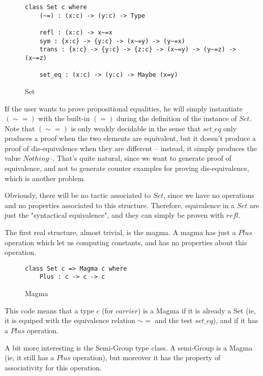 \begin{figure}[H]
\figrule
\begin{center}
\begin{verbatim}
class Set c where
    (~=) : (x:c) -> (y:c) -> Type

    refl : (x:c) -> x~=x
    sym : {x:c} -> {y:c} -> (x~=y) -> (y~=x)
    trans : {x:c} -> {y:c} -> {z:c} -> (x~=y) -> (y~=z) -> (x~=z)    
    
    set_eq : (x:c) -> (y:c) -> Maybe (x=y)
\end{verbatim}
\end{center}
\caption{Set}
\figrule
\end{figure}
If the user wants to prove propositional equalities, he will simply instantiate $(\sim=)$ with the built-in $(=)$ during the definition of the instance of $Set$.
Note that $(\sim=)$ is only weakly decidable in the sense that $set\_eq$ only produces a proof when the two elements are equivalent, but it doesn't produce a proof of dis-equivalence when they are different -- instead, it simply produces the value $Nothing$--. That's quite natural, since we want to generate proof of equivalence, and not to generate counter examples for proving dis-equivalence, which is another problem.

Obviously, there will be no tactic associated to $Set$, since we have no operations and no properties associated to this structure. Therefore, equivalence in a $Set$ are just the "syntactical equivalence", and they can simply be proven with $refl$.

The first real structure, almost trivial, is the magma. A magma has just a $Plus$ operation which let us computing constants, and has no properties about this operation.

\begin{figure}[H]
\figrule
\begin{center}
\begin{verbatim}
class Set c => Magma c where
    Plus : c -> c -> c
\end{verbatim}
\end{center}
\caption{Magma}
\figrule
\end{figure}

This code means that a type $c$ (for $carrier$) is a Magma if it is already a Set (ie, it is equiped with the equivalence relation $\sim=$ and the test $set\_eq$), and if it has a $Plus$ operation.

A bit more interesting is the Semi-Group type class. A semi-Group is a Magma (ie, it still has a $Plus$ operation), but moreover it has the property of associativity for this operation.

